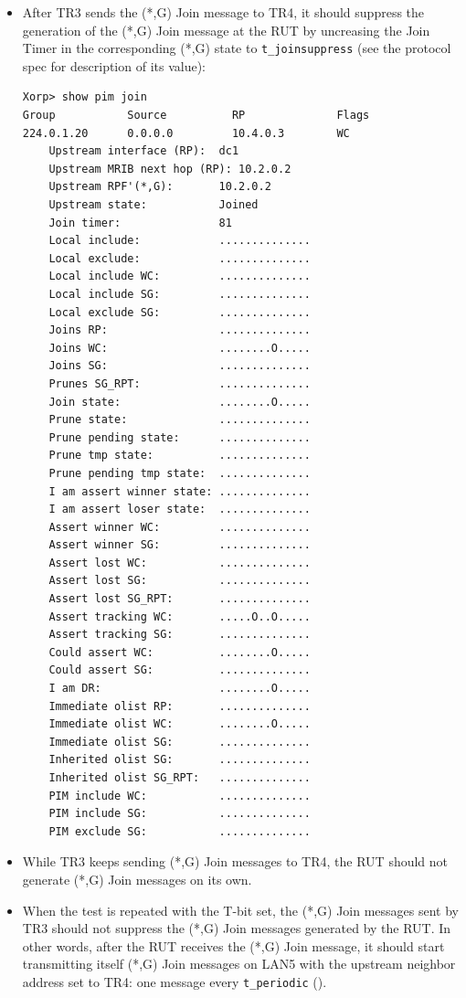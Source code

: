 \documentclass[11pt]{report}
\begin{document}
\begin{itemize}
  \item After TR3 sends the (*,G) Join message to TR4, it should suppress
  the generation of the (*,G) Join message at the RUT by uncreasing the
  Join Timer in the corresponding (*,G) state to \verb=t_joinsuppress=
  (see the protocol spec for description of its value):

\begin{verbatim}
Xorp> show pim join 
Group           Source          RP              Flags
224.0.1.20      0.0.0.0         10.4.0.3        WC   
    Upstream interface (RP):  dc1
    Upstream MRIB next hop (RP): 10.2.0.2
    Upstream RPF'(*,G):       10.2.0.2
    Upstream state:           Joined 
    Join timer:               81
    Local include:            ..............
    Local exclude:            ..............
    Local include WC:         ..............
    Local include SG:         ..............
    Local exclude SG:         ..............
    Joins RP:                 ..............
    Joins WC:                 ........O.....
    Joins SG:                 ..............
    Prunes SG_RPT:            ..............
    Join state:               ........O.....
    Prune state:              ..............
    Prune pending state:      ..............
    Prune tmp state:          ..............
    Prune pending tmp state:  ..............
    I am assert winner state: ..............
    I am assert loser state:  ..............
    Assert winner WC:         ..............
    Assert winner SG:         ..............
    Assert lost WC:           ..............
    Assert lost SG:           ..............
    Assert lost SG_RPT:       ..............
    Assert tracking WC:       .....O..O.....
    Assert tracking SG:       ..............
    Could assert WC:          ........O.....
    Could assert SG:          ..............
    I am DR:                  ........O.....
    Immediate olist RP:       ..............
    Immediate olist WC:       ........O.....
    Immediate olist SG:       ..............
    Inherited olist SG:       ..............
    Inherited olist SG_RPT:   ..............
    PIM include WC:           ..............
    PIM include SG:           ..............
    PIM exclude SG:           ..............
\end{verbatim}

  \item While TR3 keeps sending (*,G) Join messages to TR4, the RUT should
  not generate (*,G) Join messages on its own.

  \item When the test is repeated with the T-bit set, the (*,G) Join
  messages sent by TR3 should not suppress the (*,G) Join messages
  generated by the RUT. In other words, after the RUT receives the (*,G)
  Join message, it should start transmitting itself (*,G) Join messages on
  LAN5 with the upstream neighbor address set to TR4: one message every
  \verb=t_periodic= ({\PimsmTPeriodic}).

\end{itemize}
\end{document}
